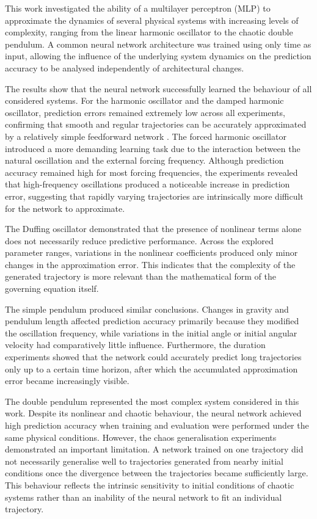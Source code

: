 This work investigated the ability of a multilayer perceptron (MLP) to approximate the dynamics of several physical systems with increasing levels of complexity, ranging from the linear harmonic oscillator to the chaotic double pendulum. A common neural network architecture was trained using only time as input, allowing the influence of the underlying system dynamics on the prediction accuracy to be analysed independently of architectural changes.

The results show that the neural network successfully learned the behaviour of all considered systems. For the harmonic oscillator and the damped harmonic oscillator, prediction errors remained extremely low across all experiments, confirming that smooth and regular trajectories can be accurately approximated by a relatively simple feedforward network \cite{cybenko1989approximation}. The forced harmonic oscillator introduced a more demanding learning task due to the interaction between the natural oscillation and the external forcing frequency. Although prediction accuracy remained high for most forcing frequencies, the experiments revealed that high-frequency oscillations produced a noticeable increase in prediction error, suggesting that rapidly varying trajectories are intrinsically more difficult for the network to approximate.

The Duffing oscillator demonstrated that the presence of nonlinear terms alone does not necessarily reduce predictive performance. Across the explored parameter ranges, variations in the nonlinear coefficients produced only minor changes in the approximation error. This indicates that the complexity of the generated trajectory is more relevant than the mathematical form of the governing equation itself.

The simple pendulum produced similar conclusions. Changes in gravity and pendulum length affected prediction accuracy primarily because they modified the oscillation frequency, while variations in the initial angle or initial angular velocity had comparatively little influence. Furthermore, the duration experiments showed that the network could accurately predict long trajectories only up to a certain time horizon, after which the accumulated approximation error became increasingly visible.

The double pendulum represented the most complex system considered in this work. Despite its nonlinear and chaotic behaviour, the neural network achieved high prediction accuracy when training and evaluation were performed under the same physical conditions. However, the chaos generalisation experiments demonstrated an important limitation. A network trained on one trajectory did not necessarily generalise well to trajectories generated from nearby initial conditions once the divergence between the trajectories became sufficiently large. This behaviour reflects the intrinsic sensitivity to initial conditions of chaotic systems \cite{lorenz1963deterministic,strogatz2015nonlinear} rather than an inability of the neural network to fit an individual trajectory.


